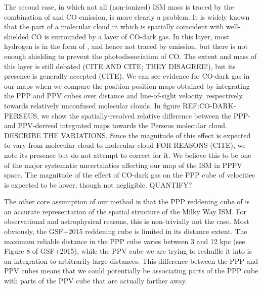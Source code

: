 The second case, in which not all (non-ionized) ISM mass is traced by the combination of \atomH and CO emission, is more clearly a problem. It is widely known that the part of a molecular cloud in which \molH is spatially coincident with well-shielded CO is surrounded by a layer of CO-dark gas. In this layer, most hydrogen is in the form of \molH, and hence not traced by \atomH emission, but there is not enough shielding to prevent the photodissociation of CO. The extent and mass of this layer is still debated (CITE AND CITE; THEY DISAGREE!), but its presence is generally accepted (CITE). We can see evidence for CO-dark gas in our maps when we compare the position-position maps obtained by integrating the PPP and PPV cubes over distance and line-of-sight velocity, respectively, towards relatively unconfused molecular clouds. In figure REF:CO-DARK-PERSEUS, we show the spatially-resolved relative difference between the PPP- and PPV-derived integrated maps towards the Perseus molecular cloud. DESCRIBE THE VARIATIONS. Since the magnitude of this effect is expected to vary from molecular cloud to molecular cloud FOR REASONS (CITE), we note its presence but do not attempt to correct for it. We believe this to be one of the major systematic uncertainties affecting our map of the ISM in PPPV space. The magnitude of the effect of CO-dark gas on the PPP cube of velocities is expected to be lower, though not negligible. QUANTIFY?

The other core assumption of our method is that the PPP reddening cube of \citet{Green_2015}  is an accurate representation of the spatial structure of the Milky Way ISM. For observational and astrophysical reasons, this is non-trivially not the case. Most obviously, the GSF+2015 reddening cube is limited in its distance extent. The maximum reliable distance in the PPP cube varies between 3 and 12 kpc (see Figure 8 of GSF+2015), while the PPV cube we are trying to reshuffle it into is an integration to arbitrarily large distances. This difference between the PPP and PPV cubes means that we could potentially be associating parts of the PPP cube with parts of the PPV cube that are actually farther away.

